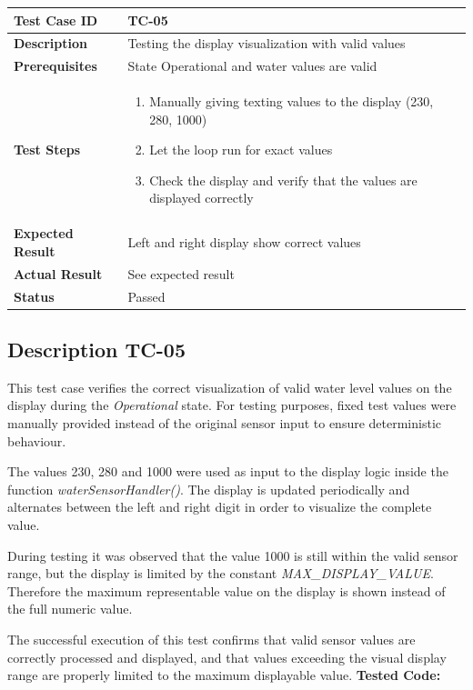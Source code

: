 \begin{table}[h]
\centering
\begin{tabular}{|p{}|p{}|}
\hline
\textbf{Test Case ID} & TC-05 \\ \hline
\textbf{Description} & Testing the display visualization with valid values \\ \hline
\textbf{Prerequisites} & State Operational and water values are valid \\ \hline
\textbf{Test Steps} &
\begin{enumerate}
\item Manually giving texting values to the display (230, 280, 1000)
\item Let the loop run for exact values
\item Check the display and verify that the values are displayed correctly
\end{enumerate}
\\ \hline
\textbf{Expected Result} & Left and right display show correct values \\ \hline
\textbf{Actual Result} & See expected result \\ \hline
\textbf{Status} & \textcolor{green!60!black}{Passed} \\ \hline
\end{tabular}
\end{table}
\newpage
\subsection{Description TC-05}
This test case verifies the correct visualization of valid water level values on the display during the 
\textit{Operational} state. For testing purposes, fixed test values were manually provided instead of the 
original sensor input to ensure deterministic behaviour.

The values 230, 280 and 1000 were used as input to the display logic inside the function 
\textit{waterSensorHandler()}. The display is updated periodically and alternates between the left and 
right digit in order to visualize the complete value.

During testing it was observed that the value 1000 is still within the valid sensor range, but the display 
is limited by the constant \textit{MAX\_DISPLAY\_VALUE}. Therefore the maximum representable value on the 
display is shown instead of the full numeric value.

The successful execution of this test confirms that valid sensor values are correctly processed and 
displayed, and that values exceeding the visual display range are properly limited to the maximum 
displayable value.
\newpage
\textbf{Tested Code:}

